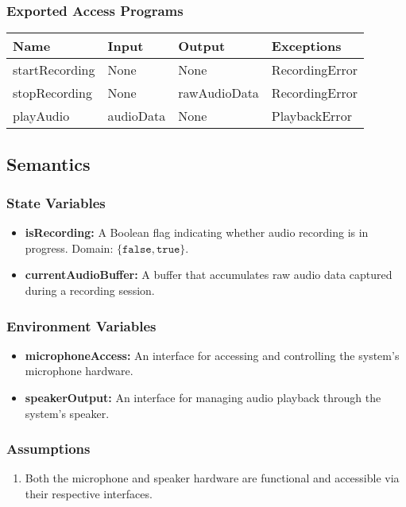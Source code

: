 \documentclass[12pt, titlepage]{article}
\begin{document}
\subsubsection{Exported Access Programs}  
\begin{center}  
\begin{tabular}{|p{3cm}|p{4cm}|p{4cm}|p{3.5cm}|}  
\hline  
\textbf{Name} & \textbf{Input} & \textbf{Output} & \textbf{Exceptions} \\  
\hline  
startRecording & None & None & RecordingError \\  
stopRecording & None & rawAudioData & RecordingError \\  
playAudio & audioData & None & PlaybackError \\  
\hline  
\end{tabular}  
\end{center}  

\subsection{Semantics}  

\subsubsection{State Variables}
\begin{itemize}
    \item \textbf{isRecording:} A Boolean flag indicating whether audio recording is in progress. Domain: $\{\texttt{false}, \texttt{true}\}$.
    \item \textbf{currentAudioBuffer:} A buffer that accumulates raw audio data captured during a recording session.
\end{itemize}

\subsubsection{Environment Variables}
\begin{itemize}
    \item \textbf{microphoneAccess:} An interface for accessing and controlling the system's microphone hardware.
    \item \textbf{speakerOutput:} An interface for managing audio playback through the system's speaker.
\end{itemize}

\subsubsection{Assumptions}
\begin{enumerate}
    \item Both the microphone and speaker hardware are functional and accessible via their respective interfaces.
\end{enumerate}
\end{document}
